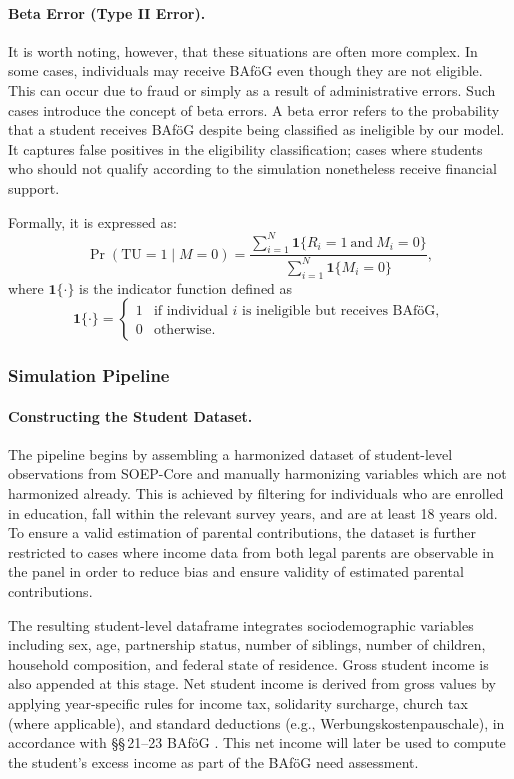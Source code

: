 \paragraph{Beta Error (Type II Error).}  
It is worth noting, however, that these situations are often more complex. 
In some cases, individuals may receive BAföG even though they are not eligible. 
This can occur due to fraud or simply as a result of administrative errors. 
Such cases introduce the concept of beta errors. 
A beta error refers to the probability that a student receives BAföG despite being classified as ineligible by our model. 
It captures false positives in the eligibility classification; cases where students who should not qualify according to the simulation nonetheless receive financial support.

Formally, it is expressed as:
\begin{equation}
\Pr(\text{TU} = 1 \mid M = 0) = \frac{\sum_{i=1}^{N} \mathbf{1}\{R_i = 1 \ \text{and} \ M_i = 0\}}{\sum_{i=1}^{N} \mathbf{1}\{M_i = 0\}},
\end{equation}
where \( \mathbf{1}\{\cdot\} \) is the indicator function defined as
\[
\mathbf{1}\{\cdot\} =
\begin{cases}
1 & \text{if individual } i \text{ is ineligible but receives BAföG}, \\
0 & \text{otherwise}.
\end{cases}
\]

\subsubsection{Simulation Pipeline}

\paragraph{Constructing the Student Dataset.}
The pipeline begins by assembling a harmonized dataset of student-level observations from SOEP-Core and manually harmonizing variables which are not harmonized already.
This is achieved by filtering for individuals who are enrolled in education, fall within the relevant survey years, and are at least 18 years old. 
To ensure a valid estimation of parental contributions, the dataset is further restricted to cases where income data from both legal parents are observable in the panel in order to reduce bias and ensure validity of estimated parental contributions.

The resulting student-level dataframe integrates sociodemographic variables including sex, age, partnership status, number of siblings, number of children, household composition, and federal state of residence. 
Gross student income is also appended at this stage. 
Net student income is derived from gross values by applying year-specific rules for income tax, solidarity surcharge, church tax (where applicable), and standard deductions (e.g., Werbungskostenpauschale), in accordance with §§\,21–23 BAföG \citep{bafoeg_law}.
This net income will later be used to compute the student’s excess income as part of the BAföG need assessment.


